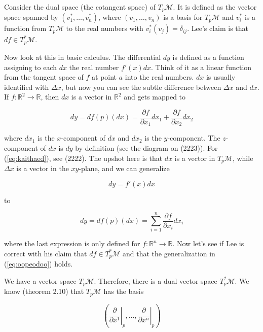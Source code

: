 \documentclass[12pt]{article}
\begin{document}
Consider the dual space (the cotangent space) of $T_{p}\mathcal{M}$.
It is defined as the vector space spanned by
$(v_{1}^{\ast},\ldots,v_{n}^{\ast})$, where $(v_{1},\ldots,v_{n})$ is
a basis for $T_{p}\mathcal{M}$ and $v_{i}^{\ast}$ is a function
from $T_{p}\mathcal{M}$ to the real numbers with
$v_{i}^{\ast}(v_{j})=\delta_{ij}$. Lee's claim is that
$df\in{}T_{p}^{\ast}\mathcal{M}$. 

Now look at this in basic calculus. The differential $dy$ is defined
as a function assigning to each $dx$ the real number $f'(x)dx$. Think
of it as a linear function from the tangent space of $f$ at point $a$
into the real numbers. $dx$ is usually identified with $\Delta{}x$,
but now you can see the subtle difference between $\Delta{}x$ and
$dx$. If $f:\mathbb{R}^{2}\rightarrow\mathbb{R}$, then $dx$ is a
vector in $\mathbb{R}^{2}$ and gets mapped to 

\begin{equation}
  \label{eq:kaithaed}
  dy=df(p)(dx)=\frac{\partial{}f}{\partial{}x_{1}}dx_{1}+\frac{\partial{}f}{\partial{}x_{2}}dx_{2}
\end{equation}

where $dx_{1}$ is the $x$-component of $dx$ and $dx_{2}$ is the
$y$-component. The $z$-component of $dx$ is $dy$ by definition (see
the diagram on (2223)). For (\ref{eq:kaithaed}), see (2222). The
upshot here is that $dx$ is a vector in $T_{p}\mathcal{M}$, while
$\Delta{}x$ is a vector in the $xy$-plane, and we can generalize

\begin{equation}
  \label{eq:lajiobie}
  dy=f'(x)dx
\end{equation}

to

\begin{equation}
  \label{eq:oopeodoo}
  dy=df(p)(dx)=\sum_{i=1}^{n}\frac{\partial{}f}{\partial{}x_{i}}dx_{i}
\end{equation}

where the last expression is only defined for
$f:\mathbb{R}^{n}\rightarrow\mathbb{R}$. Now let's see if Lee is
correct with his claim that $df\in{}T_{p}^{\ast}\mathcal{M}$ and that
the generalization in (\ref{eq:oopeodoo}) holds.

We have a vector space $T_{p}\mathcal{M}$. Therefore, there is a dual
vector space $T_{p}^{\ast}\mathcal{M}$. We know (theorem 2.10) that
$T_{p}\mathcal{M}$ has the basis

\begin{equation}
  \label{eq:feiwawee}
    \left(\left.\frac{\partial}{\partial{}x^{1}}\right\vert_{p},\ldots,\left.\frac{\partial}{\partial{}x^{n}}\right\vert_{p}\right)
\end{equation}
\end{document}
